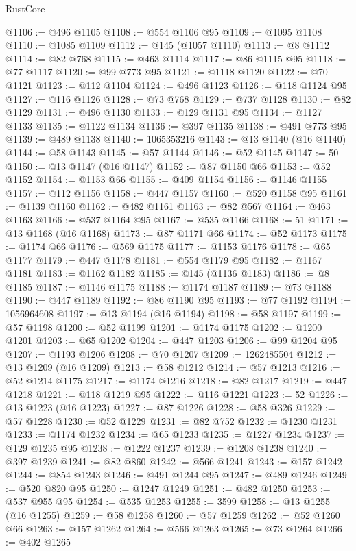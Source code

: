 \begin{lexlean}{RustCore}
\begin{coremodule}
@1106 := @496 @1105
@1108 := @554 @1106 @95
@1109 := @1095 @1108
@1110 := @1085 @1109
@1112 := @145 (@1057 @1110)
@1113 := @8 @1112
@1114 := @82 @768
@1115 := @463 @1114
@1117 := @86 @1115 @95
@1118 := @77 @1117
@1120 := @99 @773 @95
@1121 := @1118 @1120
@1122 := @70 @1121
@1123 := @112 @1104
@1124 := @496 @1123
@1126 := @118 @1124 @95
@1127 := @116 @1126
@1128 := @73 @768
@1129 := @737 @1128
@1130 := @82 @1129
@1131 := @496 @1130
@1133 := @129 @1131 @95
@1134 := @1127 @1133
@1135 := @1122 @1134
@1136 := @397 @1135
@1138 := @491 @773 @95
@1139 := @489 @1138
@1140 := 1065353216
@1143 := @13 @1140 (@16 @1140)
@1144 := @58 @1143
@1145 := @57 @1144
@1146 := @52 @1145
@1147 := 50
@1150 := @13 @1147 (@16 @1147)
@1152 := @87 @1150 @66
@1153 := @52 @1152
@1154 := @1153 @66
@1155 := @409 @1154
@1156 := @1146 @1155
@1157 := @112 @1156
@1158 := @447 @1157
@1160 := @520 @1158 @95
@1161 := @1139 @1160
@1162 := @482 @1161
@1163 := @82 @567
@1164 := @463 @1163
@1166 := @537 @1164 @95
@1167 := @535 @1166
@1168 := 51
@1171 := @13 @1168 (@16 @1168)
@1173 := @87 @1171 @66
@1174 := @52 @1173
@1175 := @1174 @66
@1176 := @569 @1175
@1177 := @1153 @1176
@1178 := @65 @1177
@1179 := @447 @1178
@1181 := @554 @1179 @95
@1182 := @1167 @1181
@1183 := @1162 @1182
@1185 := @145 (@1136 @1183)
@1186 := @8 @1185
@1187 := @1146 @1175
@1188 := @1174 @1187
@1189 := @73 @1188
@1190 := @447 @1189
@1192 := @86 @1190 @95
@1193 := @77 @1192
@1194 := 1056964608
@1197 := @13 @1194 (@16 @1194)
@1198 := @58 @1197
@1199 := @57 @1198
@1200 := @52 @1199
@1201 := @1174 @1175
@1202 := @1200 @1201
@1203 := @65 @1202
@1204 := @447 @1203
@1206 := @99 @1204 @95
@1207 := @1193 @1206
@1208 := @70 @1207
@1209 := 1262485504
@1212 := @13 @1209 (@16 @1209)
@1213 := @58 @1212
@1214 := @57 @1213
@1216 := @52 @1214 @1175
@1217 := @1174 @1216
@1218 := @82 @1217
@1219 := @447 @1218
@1221 := @118 @1219 @95
@1222 := @116 @1221
@1223 := 52
@1226 := @13 @1223 (@16 @1223)
@1227 := @87 @1226
@1228 := @58 @326
@1229 := @57 @1228
@1230 := @52 @1229
@1231 := @82 @752
@1232 := @1230 @1231
@1233 := @1174 @1232
@1234 := @65 @1233
@1235 := @1227 @1234
@1237 := @129 @1235 @95
@1238 := @1222 @1237
@1239 := @1208 @1238
@1240 := @397 @1239
@1241 := @82 @860
@1242 := @566 @1241
@1243 := @157 @1242
@1244 := @854 @1243
@1246 := @491 @1244 @95
@1247 := @489 @1246
@1249 := @520 @820 @95
@1250 := @1247 @1249
@1251 := @482 @1250
@1253 := @537 @955 @95
@1254 := @535 @1253
@1255 := 3599
@1258 := @13 @1255 (@16 @1255)
@1259 := @58 @1258
@1260 := @57 @1259
@1262 := @52 @1260 @66
@1263 := @157 @1262
@1264 := @566 @1263
@1265 := @73 @1264
@1266 := @402 @1265

\end{coremodule}
\end{lexlean}
